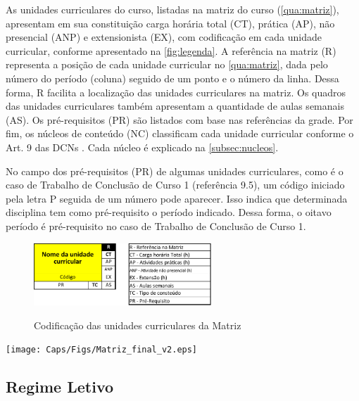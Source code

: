 As unidades curriculares do curso, listadas na matriz do curso (\autoref{qua:matriz}), apresentam em sua constituição carga horária total (CT), prática (AP), não presencial (ANP) e extensionista (EX), com codificação em cada unidade curricular, conforme apresentado na \autoref{fig:legenda}. A referência na matriz (R) representa a posição de cada unidade curricular no \autoref{qua:matriz}, dada pelo número do período (coluna) seguido de um ponto e o número da linha. Dessa forma, R facilita a localização das unidades curriculares na matriz. Os quadros das unidades curriculares também apresentam a quantidade de aulas semanais (AS). Os pré-requisitos (PR) são listados com base nas referências da grade. Por fim, os núcleos de conteúdo (NC) classificam cada unidade curricular conforme o Art. 9\textordmasculine{} das DCNs \cite{dcneng}. Cada núcleo é explicado na \autoref{subsec:nucleos}.

No campo dos pré-requisitos (PR) de algumas unidades curriculares, como é o caso de Trabalho de Conclusão de Curso 1 (referência 9.5), um código iniciado pela letra P seguida de um número pode aparecer. Isso indica que determinada disciplina tem como pré-requisito o período indicado. Dessa forma, o oitavo período é pré-requisito no caso de Trabalho de Conclusão de Curso 1.

\begin{figure}[hbt!]
	\centering
	\caption{Codificação das unidades curriculares da Matriz}
	\includegraphics[width=0.6\textwidth]{Caps/Figs/Matriz_final_v2_leg.pdf}
	\fonte{\utf}
	\label{fig:legenda}
\end{figure}

\begin{landscape}
	\begin{quadro}
		\centering
		\caption{Matriz do Curso de Engenharia Eletrônica}
		\texttt{[image: Caps/Figs/Matriz\_final\_v2.eps]}
		\fonte{\utf}
		\label{qua:matriz}
	\end{quadro}
\end{landscape}
\restoregeometry



\subsection{Regime Letivo}
\label{sub:reg}

